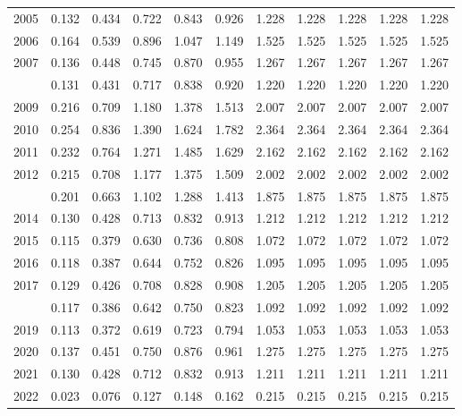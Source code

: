 \documentclass[
]{article}
\begin{document}
\begin{longtable}[t]{lrrrrrrrrrr}
2005 & 0.132 & 0.434 & 0.722 & 0.843 & 0.926 & 1.228 & 1.228 & 1.228 & 1.228 & 1.228\\
2006 & 0.164 & 0.539 & 0.896 & 1.047 & 1.149 & 1.525 & 1.525 & 1.525 & 1.525 & 1.525\\
2007 & 0.136 & 0.448 & 0.745 & 0.870 & 0.955 & 1.267 & 1.267 & 1.267 & 1.267 & 1.267\\
\addlinespace
2008 & 0.131 & 0.431 & 0.717 & 0.838 & 0.920 & 1.220 & 1.220 & 1.220 & 1.220 & 1.220\\
2009 & 0.216 & 0.709 & 1.180 & 1.378 & 1.513 & 2.007 & 2.007 & 2.007 & 2.007 & 2.007\\
2010 & 0.254 & 0.836 & 1.390 & 1.624 & 1.782 & 2.364 & 2.364 & 2.364 & 2.364 & 2.364\\
2011 & 0.232 & 0.764 & 1.271 & 1.485 & 1.629 & 2.162 & 2.162 & 2.162 & 2.162 & 2.162\\
2012 & 0.215 & 0.708 & 1.177 & 1.375 & 1.509 & 2.002 & 2.002 & 2.002 & 2.002 & 2.002\\
\addlinespace
2013 & 0.201 & 0.663 & 1.102 & 1.288 & 1.413 & 1.875 & 1.875 & 1.875 & 1.875 & 1.875\\
2014 & 0.130 & 0.428 & 0.713 & 0.832 & 0.913 & 1.212 & 1.212 & 1.212 & 1.212 & 1.212\\
2015 & 0.115 & 0.379 & 0.630 & 0.736 & 0.808 & 1.072 & 1.072 & 1.072 & 1.072 & 1.072\\
2016 & 0.118 & 0.387 & 0.644 & 0.752 & 0.826 & 1.095 & 1.095 & 1.095 & 1.095 & 1.095\\
2017 & 0.129 & 0.426 & 0.708 & 0.828 & 0.908 & 1.205 & 1.205 & 1.205 & 1.205 & 1.205\\
\addlinespace
2018 & 0.117 & 0.386 & 0.642 & 0.750 & 0.823 & 1.092 & 1.092 & 1.092 & 1.092 & 1.092\\
2019 & 0.113 & 0.372 & 0.619 & 0.723 & 0.794 & 1.053 & 1.053 & 1.053 & 1.053 & 1.053\\
2020 & 0.137 & 0.451 & 0.750 & 0.876 & 0.961 & 1.275 & 1.275 & 1.275 & 1.275 & 1.275\\
2021 & 0.130 & 0.428 & 0.712 & 0.832 & 0.913 & 1.211 & 1.211 & 1.211 & 1.211 & 1.211\\
2022 & 0.023 & 0.076 & 0.127 & 0.148 & 0.162 & 0.215 & 0.215 & 0.215 & 0.215 & 0.215\\*
\end{longtable}
\end{document}
